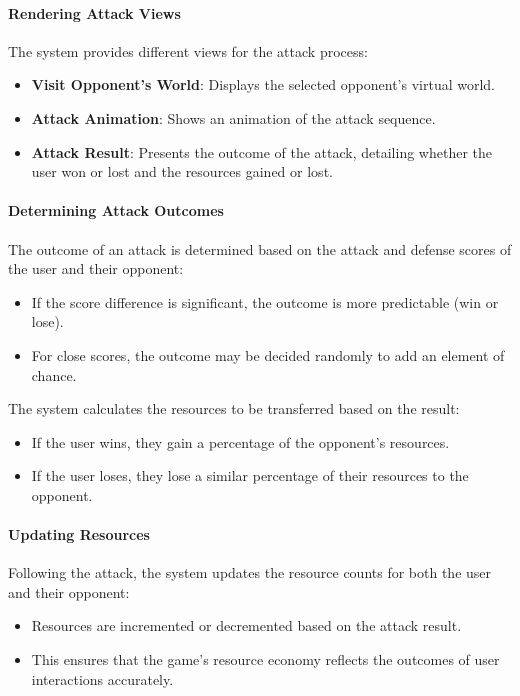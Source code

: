\documentclass[12pt]{article}
\begin{document}
\paragraph{Rendering Attack Views}
The system provides different views for the attack process:
\begin{itemize}
    \item \textbf{Visit Opponent's World}: Displays the selected opponent’s virtual world.
    \item \textbf{Attack Animation}: Shows an animation of the attack sequence.
    \item \textbf{Attack Result}: Presents the outcome of the attack, detailing whether the user won or lost and the resources gained or lost.
\end{itemize}

\paragraph{Determining Attack Outcomes}
The outcome of an attack is determined based on the attack and defense scores of the user and their opponent:
\begin{itemize}
    \item If the score difference is significant, the outcome is more predictable (win or lose).
    \item For close scores, the outcome may be decided randomly to add an element of chance.
\end{itemize}
The system calculates the resources to be transferred based on the result:
\begin{itemize}
    \item If the user wins, they gain a percentage of the opponent’s resources.
    \item If the user loses, they lose a similar percentage of their resources to the opponent.
\end{itemize}

\paragraph{Updating Resources}
Following the attack, the system updates the resource counts for both the user and their opponent:
\begin{itemize}
    \item Resources are incremented or decremented based on the attack result.
    \item This ensures that the game’s resource economy reflects the outcomes of user interactions accurately.
\end{itemize}
\end{document}
